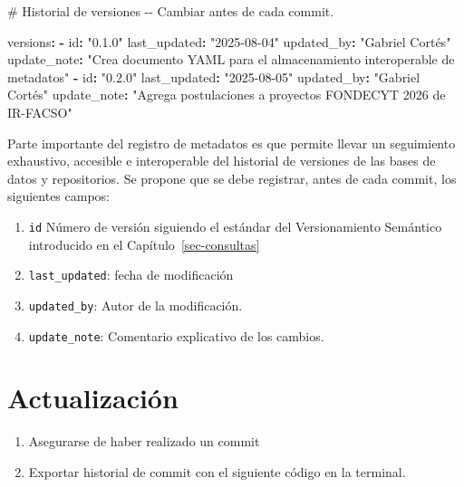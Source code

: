 \documentclass[
  spanish,
  letterpaper,
  DIV=11,
  numbers=noendperiod]{scrreprt}
\newenvironment{Shaded}{\begin{snugshade}}{\end{snugshade}}
\newcommand{\AttributeTok}[1]{\textcolor[rgb]{0.40,0.45,0.13}{#1}}
\newcommand{\CommentTok}[1]{\textcolor[rgb]{0.37,0.37,0.37}{#1}}
\newcommand{\FunctionTok}[1]{\textcolor[rgb]{0.28,0.35,0.67}{#1}}
\newcommand{\KeywordTok}[1]{\textcolor[rgb]{0.00,0.23,0.31}{\textbf{#1}}}
\newcommand{\StringTok}[1]{\textcolor[rgb]{0.13,0.47,0.30}{#1}}
\providecommand{\tightlist}{%
  \setlength{\itemsep}{0pt}\setlength{\parskip}{0pt}}
\begin{document}
\begin{Shaded}
\begin{Highlighting}[]
\CommentTok{\# Historial de versiones {-}{-} Cambiar antes de cada commit.}

\FunctionTok{versions}\KeywordTok{:}\AttributeTok{ }
\AttributeTok{ }\KeywordTok{{-}}\AttributeTok{ }\FunctionTok{id}\KeywordTok{:}\AttributeTok{ }\StringTok{"0.1.0"}
\AttributeTok{   }\FunctionTok{last\_updated}\KeywordTok{:}\AttributeTok{ }\StringTok{"2025{-}08{-}04"}
\AttributeTok{   }\FunctionTok{updated\_by}\KeywordTok{:}\AttributeTok{ }\StringTok{"Gabriel Cortés"}
\AttributeTok{   }\FunctionTok{update\_note}\KeywordTok{:}\AttributeTok{ }\StringTok{"Crea documento YAML para el almacenamiento interoperable de metadatos"}
\AttributeTok{ }\KeywordTok{{-}}\AttributeTok{ }\FunctionTok{id}\KeywordTok{:}\AttributeTok{ }\StringTok{"0.2.0"}
\AttributeTok{   }\FunctionTok{last\_updated}\KeywordTok{:}\AttributeTok{ }\StringTok{"2025{-}08{-}05"}
\AttributeTok{   }\FunctionTok{updated\_by}\KeywordTok{:}\AttributeTok{ }\StringTok{"Gabriel Cortés"}
\AttributeTok{   }\FunctionTok{update\_note}\KeywordTok{:}\AttributeTok{ }\StringTok{"Agrega postulaciones a proyectos FONDECYT 2026 de IR{-}FACSO"}
\end{Highlighting}
\end{Shaded}

Parte importante del registro de metadatos es que permite llevar un
seguimiento exhaustivo, accesible e interoperable del historial de
versiones de las bases de datos y repositorios. Se propone que se debe
registrar, antes de cada commit, los siguientes campos:

\begin{enumerate}
\def\labelenumi{\arabic{enumi}.}
\tightlist
\item
  \texttt{id} Número de versión siguiendo el estándar del Versionamiento
  Semántico introducido en el Capítulo~\ref{sec-consultas}
\item
  \texttt{last\_updated}: fecha de modificación
\item
  \texttt{updated\_by}: Autor de la modificación.
\item
  \texttt{update\_note}: Comentario explicativo de los cambios.
\end{enumerate}

\section{Actualización}\label{actualizaciuxf3n}

\begin{enumerate}
\def\labelenumi{\arabic{enumi}.}
\item
  Asegurarse de haber realizado un commit
\item
  Exportar historial de commit con el siguiente código en la terminal.
\end{enumerate}
\end{document}
